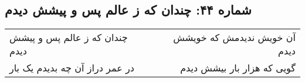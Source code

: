 \begin{center}
\section*{شماره ۴۴: چندان که ز عالم پس و پیشش دیدم}
\label{sec:044}
\begin{longtable}{l p{0.5cm} r}
چندان که ز عالم پس و پیشش دیدم
&&
آن خویش ندیدمش که خویشش دیدم
\\
در عمر دراز آن چه بدیدم یک بار
&&
گویی که هزار بار بیشش دیدم
\\
\end{longtable}
\end{center}

